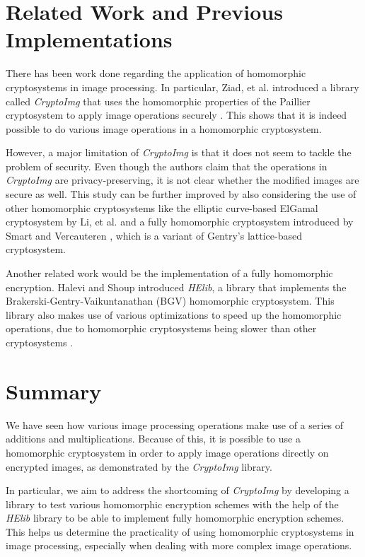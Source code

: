 \section{Related Work and Previous Implementations}




There has been work done regarding the application of homomorphic cryptosystems in image processing. In particular, Ziad, et al. introduced a library called \textit{CryptoImg} that uses the homomorphic properties of the Paillier cryptosystem to apply image operations securely \cite{ziad_cryptoimg:_2016}. This shows that it is indeed possible to do various image operations in a homomorphic cryptosystem.

However, a major limitation of \textit{CryptoImg} is that it does not seem to tackle the problem of security. Even though the authors claim that the operations in \textit{CryptoImg} are privacy-preserving, it is not clear whether the modified images are secure as well.
This study can be further improved by also considering the use of other homomorphic cryptosystems like the elliptic curve-based ElGamal cryptosystem by Li, et al. \cite{li_elliptic_2012} and a fully homomorphic cryptosystem introduced by Smart and Vercauteren \cite{hutchison_fully_2010}, which is a variant of Gentry's lattice-based cryptosystem.

Another related work would be the implementation of a fully homomorphic encryption. Halevi and Shoup \cite{garay_algorithms_2014} introduced \textit{HElib}, a library that implements the Brakerski-Gentry-Vaikuntanathan (BGV) homomorphic cryptosystem. This library also makes use of various optimizations to speed up the homomorphic operations, due to homomorphic cryptosystems being slower than other cryptosystems \cite{sen_homomorphic_2013}.


\section{Summary}
We have seen how various image processing operations make use of a series of additions and multiplications. Because of this, it is possible to use a homomorphic cryptosystem in order to apply image operations directly on encrypted images, as demonstrated by the \textit{CryptoImg} library. 

In particular, we aim to address the shortcoming of \textit{CryptoImg} by developing a library to test various homomorphic encryption schemes with the help of the \textit{HElib} library to be able to implement fully homomorphic encryption schemes. This helps us determine the practicality of using homomorphic cryptosystems in image processing, especially when dealing with more complex image operations.





